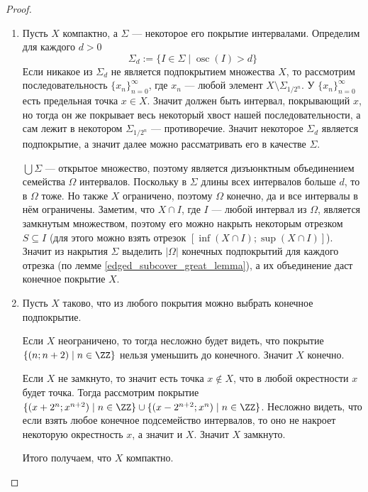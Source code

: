 \documentclass[12pt,a4paper]{article}
\DeclareMathOperator*{\osc}{osc}
\begin{document}
    \begin{proof}
        \begin{enumerate}
            \item Пусть $X$ компактно, а $\Sigma$ --- некоторое его покрытие интервалами. Определим для каждого $d > 0$
                \[\Sigma_d := \{I \in \Sigma\mid \osc(I) > d\}\]
                Если никакое из $\Sigma_d$ не является подпокрытием множества $X$, то рассмотрим последовательность $\{x_n\}_{n=0}^\infty$, где $x_n$ --- любой элемент $X \setminus \Sigma_{1/2^n}$. У $\{x_n\}_{n=0}^\infty$ есть предельная точка $x \in X$. Значит должен быть интервал, покрывающий $x$, но тогда он же покрывает весь некоторый хвост нашей последовательности, а сам лежит в некотором $\Sigma_{1/2^n}$ --- противоречие. Значит некоторое $\Sigma_d$ является подпокрытие, а значит далее можно рассматривать его в качестве $\Sigma$.

                $\bigcup \Sigma$ --- открытое множество, поэтому является дизъюнктным объединением семейства $\Omega$ интервалов. Поскольку в $\Sigma$ длины всех интервалов больше $d$, то в $\Omega$ тоже. Но также $X$ ограничено, поэтому $\Omega$ конечно, да и все интервалы в нём ограничены. Заметим, что $X \cap I$, где $I$ --- любой интервал из $\Omega$, является замкнутым множеством, поэтому его можно накрыть некоторым отрезком $S \subseteq I$ (для этого можно взять отрезок $[\inf(X \cap I); \sup(X \cap I)]$). Значит из накрытия $\Sigma$ выделить $|\Omega|$ конечных подпокрытий для каждого отрезка (по лемме \ref{edged_subcover_great_lemma}), а их объединение даст конечное покрытие $X$.

            \item Пусть $X$ таково, что из любого покрытия можно выбрать конечное подпокрытие.
            
                Если $X$ неограничено, то тогда несложно будет видеть, что покрытие $\{(n; n+2) \mid n \in \ZZ\}$ нельзя уменьшить до конечного. Значит $X$ конечно.

                Если $X$ не замкнуто, то значит есть точка $x \notin X$, что в любой окрестности $x$ будет точка. Тогда рассмотрим покрытие $\{(x + 2^n; x^{n+2}) \mid n \in \ZZ\} \cup \{(x - 2^{n+2}; x^n) \mid n \in \ZZ\}$. Несложно видеть, что если взять любое конечное подсемейство интервалов, то оно не накроет некоторую окрестность $x$, а значит и $X$. Значит $X$ замкнуто.

                Итого получаем, что $X$ компактно.
        \end{enumerate}
    \end{proof}
\end{document}
